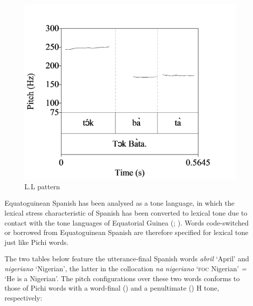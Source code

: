 \begin{figure}
\label{fig:key:3.8}
\caption{L.L pattern}
\includegraphics[height=.3\textheight]{figures/yakpomod-img10.png}
\end{figure}

Equatoguinean Spanish has been analysed as a tone language, in which the lexical stress characteristic of Spanish has been converted to lexical tone due to contact with the tone languages of Equatorial Guinea (\citealt{Lipski2015}; \citealt{SteienYakpo2017}). Words code-switched or borrowed from Equatoguinean Spanish are therefore specified for lexical tone just like Pichi words. 


The two tables below feature the utterance-final Spanish words \textit{abril} ‘April’ and \textit{nigeriano} ‘Nigerian’, the latter in the collocation \textit{na} \textit{nigeriano} ‘\textsc{foc} Nigerian’ \textit{=} ‘He is a Nigerian’. The pitch configurations over these two words conforms to those of Pichi words with a word-final () and a penultimate () H tone, respectively: 


